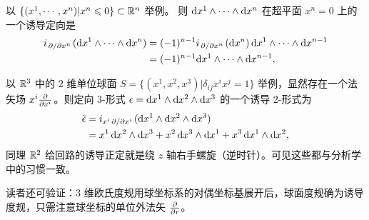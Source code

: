 \begin{eg}
    以 $\{(x^1,\cdots,x^n)|x^n\leqslant 0\}\subset\mathbb{R}^n$ 举例。
则 $\dd x^1 \wedge\cdots\wedge \dd x^{n}$ 在超平面 $x^n=0$ 上的一个诱导定向是
\begin{align*}
    i_{\pdv*{x^n}}(\dd x^1 \wedge\cdots\wedge \dd x^{n})&=(-1)^{n-1} i_{\pdv*{x^n}}( \dd x^{n})\,\dd x^1 \wedge\cdots\wedge \dd x^{n-1}\\
    &=(-1)^{n-1} \dd x^1 \wedge\cdots\wedge \dd x^{n-1},
\end{align*}
\end{eg}
\begin{eg}
    以 $\mathbb{R}^3$ 中的 2 维单位球面 $S=\{(x^1,x^2,x^3)|\delta_{ij} x^i x^j=1\}$ 举例，显然存在一个法矢场 $x^i\pdv{x^i}$。则定向 3-形式 $\epsilon =\dd x^1\wedge\dd x^2\wedge\dd x^3$ 的一个诱导 2-形式为
    \begin{align*}
        \tilde\epsilon &=i_{x^i\pdv*{x^i}}(\dd x^1\wedge\dd x^2\wedge\dd x^3)\\
        &=x^1\,\dd x^2 \wedge \dd x^3 +x^2\,\dd x^3 \wedge \dd x^1 + x^3\,\dd x^1 \wedge \dd x^2,
    \end{align*}
    同理 $\mathbb{R}^2$ 给回路的诱导正定就是绕 $z$ 轴右手螺旋（逆时针）。可见这些都与分析学中的习惯一致。

    读者还可验证：3 维欧氏度规用球坐标系的对偶坐标基展开后，球面度规确为诱导度规，只需注意球坐标的单位外法矢 $\pdv{r}$。
\end{eg}

